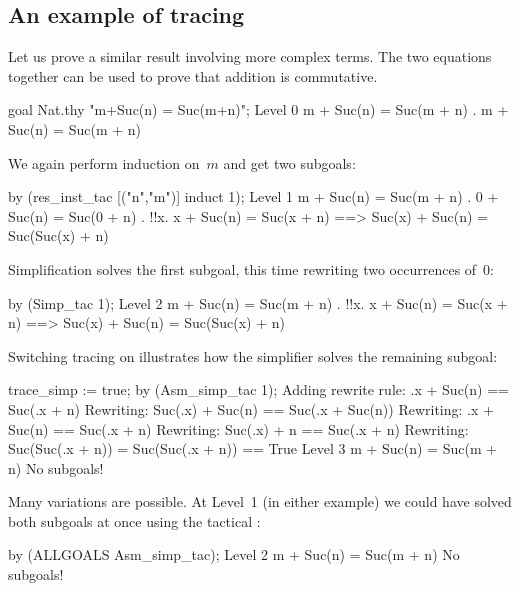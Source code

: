 \subsection{An example of tracing}
Let us prove a similar result involving more complex terms.  The two
equations together can be used to prove that addition is commutative.
\begin{ttbox}
goal Nat.thy "m+Suc(n) = Suc(m+n)";
{\out Level 0}
{\out m + Suc(n) = Suc(m + n)}
{. m + Suc(n) = Suc(m + n)}
\end{ttbox}
We again perform induction on~$m$ and get two subgoals:
\begin{ttbox}
by (res_inst_tac [("n","m")] induct 1);
{\out Level 1}
{\out m + Suc(n) = Suc(m + n)}
{. 0 + Suc(n) = Suc(0 + n)}
{. !!x. x + Suc(n) = Suc(x + n) ==>}
{\out          Suc(x) + Suc(n) = Suc(Suc(x) + n)}
\end{ttbox}
Simplification solves the first subgoal, this time rewriting two
occurrences of~0:
\begin{ttbox}
by (Simp_tac 1);
{\out Level 2}
{\out m + Suc(n) = Suc(m + n)}
{. !!x. x + Suc(n) = Suc(x + n) ==>}
{\out          Suc(x) + Suc(n) = Suc(Suc(x) + n)}
\end{ttbox}
Switching tracing on illustrates how the simplifier solves the remaining
subgoal: 
\begin{ttbox}
trace_simp := true;
by (Asm_simp_tac 1);
\ttbreak
{\out Adding rewrite rule:}
{\out .x + Suc(n) == Suc(.x + n)}
\ttbreak
{\out Rewriting:}
{\out Suc(.x) + Suc(n) == Suc(.x + Suc(n))}
\ttbreak
{\out Rewriting:}
{\out .x + Suc(n) == Suc(.x + n)}
\ttbreak
{\out Rewriting:}
{\out Suc(.x) + n == Suc(.x + n)}
\ttbreak
{\out Rewriting:}
{\out Suc(Suc(.x + n)) = Suc(Suc(.x + n)) == True}
\ttbreak
{\out Level 3}
{\out m + Suc(n) = Suc(m + n)}
{\out No subgoals!}
\end{ttbox}
Many variations are possible.  At Level~1 (in either example) we could have
solved both subgoals at once using the tactical :
\begin{ttbox}
by (ALLGOALS Asm_simp_tac);
{\out Level 2}
{\out m + Suc(n) = Suc(m + n)}
{\out No subgoals!}
\end{ttbox}

